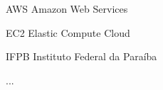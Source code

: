  

  
 

\listoffigures*
\cleardoublepage




\begin{siglas}
  \item[AWS] Amazon Web Services
  \item[EC2] Elastic Compute Cloud
  \item[IFPB] Instituto Federal da Paraíba
  \item[...]
\end{siglas}


